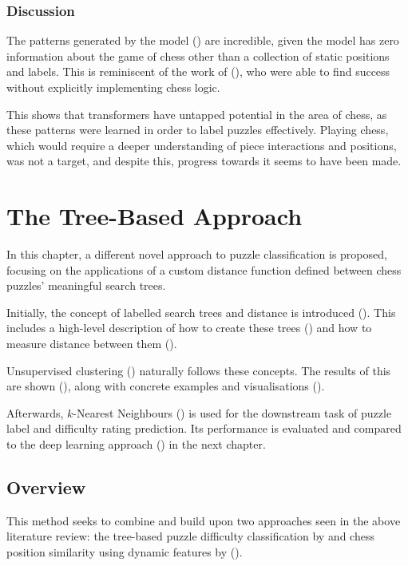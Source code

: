 \subsection{Discussion}\label{mlS33}

The patterns generated by the model () are incredible, given the
model has zero information about the game of chess other than a collection of
static positions and labels. This is reminiscent of the work of
\citet{chess2vec} (), who were able to find success without
explicitly implementing chess logic.

This shows that transformers have untapped potential in the area of chess, as
these patterns were learned in order to label puzzles effectively. Playing
chess, which would require a deeper understanding of piece interactions and
positions, was not a target, and despite this, progress towards it seems to
have been made.




\chapter{The Tree-Based Approach}\label{treeChapter}

In this chapter, a different novel approach to puzzle classification is
proposed, focusing on the applications of a custom distance function defined
between chess puzzles' meaningful search trees.

Initially, the concept of labelled search trees and distance is introduced
(). This includes a high-level description of how to create these
trees () and how to measure distance between them
().

Unsupervised clustering () naturally follows these concepts. The
results of this are shown (), along with concrete examples and
visualisations ().

Afterwards, $k$-Nearest Neighbours () is used for the downstream
task of puzzle label and difficulty rating prediction. Its performance is
evaluated and compared to the deep learning approach () in the
next chapter.

\section{Overview}\label{treeS1}

This method seeks to combine and build upon two approaches seen in the above
literature review: the tree-based puzzle difficulty classification by
\citet{chessTrees} and chess position similarity using dynamic features by
\citet{chessMotifs} ().

